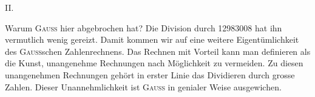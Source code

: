 \clearpage\begingroup
{}
\renewcommand{\thefootnote}{\arabic{footnote})}\setcounter{footnote}{0}
\newcommand{\MLowComma}{\mathord{\raisebox{-.45ex}{,}}}
\begin{center}II.\\[3pt]{\large{}}\end{center}
\noindent\hspace*{\parindent}Warum \textsc{Gauss} hier abgebrochen hat? Die Division durch 12983008
hat ihn vermutlich wenig gereizt. Damit kommen wir auf eine weitere Eigentümlichkeit des \textsc{Gauss}schen Zahlenrechnens. Das Rechnen mit Vorteil kann
man definieren als die Kunst, unangenehme Rechnungen nach Möglichkeit
zu vermeiden. Zu diesen unangenehmen Rechnungen gehört in erster Linie
das Dividieren durch grosse Zahlen. Dieser Unannehmlichkeit ist \textsc{Gauss} in
genialer Weise ausgewichen.

